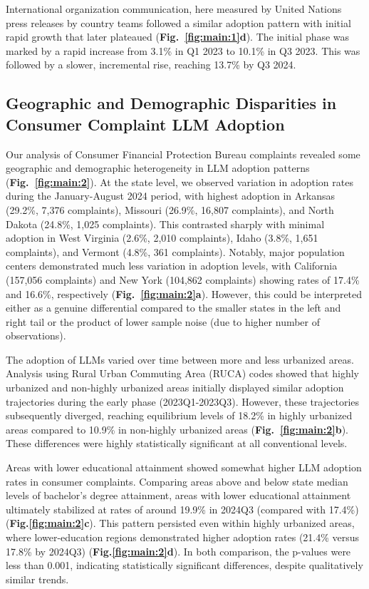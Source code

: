 International organization communication, here measured by United Nations press releases by country teams followed a similar adoption pattern with initial rapid growth that later plateaued (\textbf{Fig.~\ref{fig:main:1}d}). The initial phase was marked by a rapid increase from 3.1\% in Q1 2023 to 10.1\% in Q3 2023. This was followed by a slower, incremental rise, reaching 13.7\% by Q3 2024. 

\subsection*{Geographic and Demographic Disparities in Consumer Complaint LLM Adoption}


Our analysis of Consumer Financial Protection Bureau complaints revealed some geographic and demographic heterogeneity in LLM adoption patterns (\textbf{Fig.~\ref{fig:main:2}}).  At the state level, we observed variation in adoption rates during the January-August 2024 period, with highest adoption in Arkansas (29.2\%, 7,376 complaints), Missouri (26.9\%, 16,807 complaints), and North Dakota (24.8\%, 1,025 complaints). This contrasted sharply with minimal adoption in West Virginia (2.6\%, 2,010 complaints), Idaho (3.8\%, 1,651 complaints), and Vermont (4.8\%, 361 complaints). Notably, major population centers demonstrated much less variation in adoption levels, with California (157,056 complaints) and New York (104,862 complaints) showing rates of 17.4\% and 16.6\%, respectively (\textbf{Fig.~\ref{fig:main:2}a}). However, this could be interpreted either as a genuine differential compared to the smaller states in the left and right tail or the product of lower sample noise (due to higher number of observations).


The adoption of LLMs varied over time between more and less urbanized areas. Analysis using Rural Urban Commuting Area (RUCA) codes showed that highly urbanized and non-highly urbanized areas initially displayed similar adoption trajectories during the early phase (2023Q1-2023Q3). However, these trajectories subsequently diverged, reaching equilibrium levels of 18.2\% in highly urbanized areas compared to 10.9\% in non-highly urbanized areas (\textbf{Fig.~\ref{fig:main:2}b}). These differences were highly statistically significant at all conventional levels.


Areas with lower educational attainment showed somewhat higher LLM adoption rates in consumer complaints. Comparing areas above and below state median levels of bachelor's degree attainment, areas with lower educational attainment ultimately stabilized at rates of around 19.9\% in 2024Q3 (compared with 17.4\%) (\textbf{Fig.\ref{fig:main:2}c}). This pattern persisted even within highly urbanized areas, where lower-education regions demonstrated higher adoption rates (21.4\% versus 17.8\% by 2024Q3) (\textbf{Fig.\ref{fig:main:2}d}). In both comparison, the p-values were less than 0.001, indicating statistically significant differences, despite qualitatively similar trends. 




